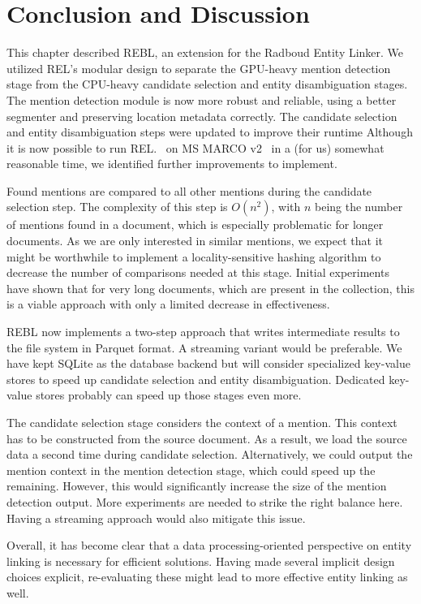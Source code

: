\section{Conclusion and Discussion}
This chapter described REBL, an extension for the Radboud Entity Linker. We utilized REL's modular design to separate the GPU-heavy mention detection stage from the CPU-heavy candidate selection and entity disambiguation stages. The mention detection module is now more robust and reliable, using a better segmenter and preserving location metadata correctly.
The candidate selection and entity disambiguation steps were updated to improve their runtime Although it is now possible to run REL.~\citep{rel} on MS MARCO v2~\citep{msmarco} in a (for us) somewhat reasonable time, we identified further improvements to implement.

Found mentions are compared to all other mentions during the candidate selection step. The complexity of this step is $O(n^2)$, with $n$ being the number of mentions found in a document, which is especially problematic for longer documents. As we are only interested in similar mentions, we expect that it might be worthwhile to implement a locality-sensitive hashing algorithm to decrease the number of comparisons needed at this stage. Initial experiments have shown that for very long documents, which are present in the collection, this is a viable approach with only a limited decrease in effectiveness. 

REBL now implements a two-step approach that writes intermediate results to the file system in Parquet format. A streaming variant would be preferable. We have kept SQLite as the database backend but will consider specialized key-value stores to speed up candidate selection and entity disambiguation. Dedicated key-value stores probably can speed up those stages even more. 

The candidate selection stage considers the context of a mention. This context has to be constructed from the source document. As a result, we load the source data a second time during candidate selection. Alternatively, we could output the mention context in the mention detection stage, which could speed up the remaining. However, this would significantly increase the size of the mention detection output. More experiments are needed to strike the right balance here. Having a streaming approach would also mitigate this issue. 

Overall, it has become clear that a data processing-oriented perspective on entity linking is necessary for efficient solutions. Having made several implicit design choices explicit, re-evaluating these might lead to more effective entity linking as well. 